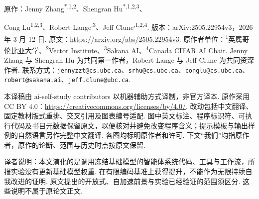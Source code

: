 \label{dgm-paper}
原作：Jenny Zhang\textsuperscript{*,1,2}、Shengran Hu\textsuperscript{*,1,2,3}、\par
\noindent Cong Lu\textsuperscript{1,2,3}、Robert Lange\textsuperscript{\dag,3}、Jeff Clune\textsuperscript{\dag,1,2,4}.
版本：arXiv:2505.22954v3，2026 年 3 月 12 日.
原文：\url{https://arxiv.org/abs/2505.22954v3}.
原作者单位：\textsuperscript{1}英属哥伦比亚大学、\textsuperscript{2}Vector Institute、\textsuperscript{3}Sakana AI、\textsuperscript{4}Canada CIFAR AI Chair.
Jenny Zhang 与 Shengran Hu 为共同第一作者，Robert Lange 与 Jeff Clune 为共同资深作者.
联系方式：\texttt{jennyzzt@cs.ubc.ca}、\texttt{srhu@cs.ubc.ca}、\texttt{conglu@cs.ubc.ca}、\texttt{robert@sakana.ai}、\texttt{jeff.clune@ubc.ca}.

本译稿由 ai-self-study contributors 以机器辅助方式译制，非官方译本. 原作采用 CC BY 4.0：\url{https://creativecommons.org/licenses/by/4.0/}. 改动包括中文翻译、固定教材版式重排、交叉引用及图表编号适配. 图中英文标注、程序标识符、可执行代码及书目元数据保留原文，以便核对并避免改变程序含义；提示模板与输出样例的自然语言另作完整中文翻译. 各图均标明原作者和许可. 下文“我们”均指原作者，原作的论断、范围与历史时点按原文保留.

\begin{remark}
译者说明：本文演化的是调用冻结基础模型的智能体系统代码、工具与工作流，所报实验没有更新基础模型权重. 在有限编码基准上获得提升，不能作为无限持续自我改进的证明. 原文提出的开放式、自加速前景与实验已经验证的范围须区分. 这些说明不属于原论文正文.
\end{remark}




